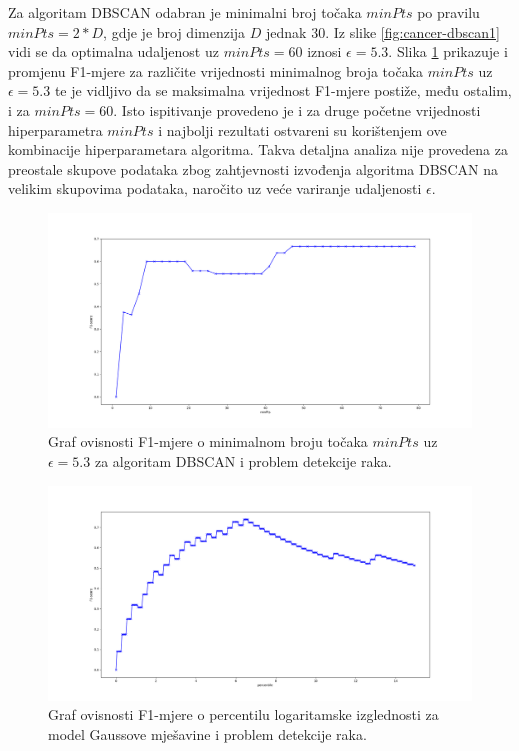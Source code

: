 \documentclass[utf8, diplomski, numeric]{fer}
\begin{document}
Za algoritam DBSCAN odabran je minimalni broj točaka $minPts$ po pravilu $minPts =2*D$, gdje je broj dimenzija $D$ jednak 30. Iz slike \ref{fig:cancer-dbscan1} vidi se da optimalna udaljenost uz $minPts = 60$ iznosi $\epsilon = 5.3$. Slika \ref{fig:cancer-dbscan2} prikazuje i promjenu F1-mjere za različite vrijednosti minimalnog broja točaka $minPts$ uz $\epsilon = 5.3$ te je vidljivo da se maksimalna vrijednost F1-mjere postiže, među ostalim, i za $minPts = 60$. Isto ispitivanje provedeno je i za druge početne vrijednosti hiperparametra $minPts$ i najbolji rezultati ostvareni su korištenjem ove kombinacije hiperparametara algoritma. Takva detaljna analiza nije provedena za preostale skupove podataka zbog zahtjevnosti izvođenja algoritma DBSCAN na velikim skupovima podataka, naročito uz veće variranje udaljenosti $\epsilon$.

\begin{figure}[h!]
\includegraphics[width=1\textwidth]{images/cancer-dbscan-f1.png}
\centering
\caption{Graf ovisnosti F1-mjere o minimalnom broju točaka $minPts$ uz $\epsilon = 5.3$ za algoritam DBSCAN i problem detekcije raka.}
\label{fig:cancer-dbscan2}
\end{figure}

\begin{figure}[h!]
\includegraphics[width=1\textwidth]{images/cancer-gauss-f1.png}
\centering
\caption{Graf ovisnosti F1-mjere o percentilu logaritamske izglednosti za model Gaussove mješavine i problem detekcije raka.}
\label{fig:cancer-gauss}
\end{figure}
\end{document}
